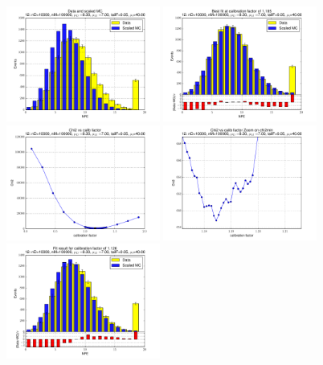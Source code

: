 
 \begin{figure}[htbp] \begin{center} 
\includegraphics[width=0.45\textwidth]{../FIGURES/12/FIG_Data_and_scaled_MC.pdf} 
\includegraphics[width=0.45\textwidth]{../FIGURES/12/FIG_Best_fit_at_calibration_factor_of_1_185.pdf} 
\includegraphics[width=0.45\textwidth]{../FIGURES/12/FIG_Chi2_vs_calib_factor.pdf} 
\includegraphics[width=0.45\textwidth]{../FIGURES/12/FIG_Chi2_vs_calib_factor_Zoom_on_chi2min.pdf} 
\includegraphics[width=0.45\textwidth]{../FIGURES/12/FIG_Fit_result_for_calibration_factor_of_1_126.pdf} 

\end{center}
\end{figure}
